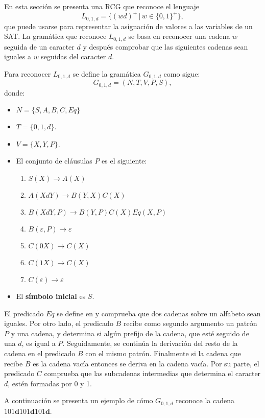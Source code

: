En esta sección se presenta una RCG que reconoce el lenguaje $$L_{0,1,d}=\{(wd)^+\,|\,w\in\{0,1\}^+\},$$ que puede usarse para representar la asignación de valores a las variables de un SAT. La gramática que reconoce $L_{0,1,d}$ se basa en reconocer una cadena $w$ seguida de un caracter $d$ y después comprobar que las siguientes cadenas sean iguales a $w$ seguidas del caracter $d$.

Para reconocer $L_{0,1,d}$ se define la gramática $G_{0,1,d}$ como sigue:
\[
    G_{0,1,d} = (N, T, V, P, S),
\]
donde:

\begin{itemize}
    \item $N=\{S,A,B,C,Eq\}$
    \item $T=\{0,1,d\}$.
    \item $V=\{X,Y,P\}$.
    \item El conjunto de cláusulas $P$ es el siguiente:
          \begin{enumerate}
              \item $S(X)\to A(X)$
              \item $A(XdY)\to B(Y,X)C(X)$
              \item $B(XdY,P)\to B(Y,P) C(X) Eq(X,P)$
              \item $B(\varepsilon,P)\to \varepsilon$
              \item $C(0X)\to C(X)$
              \item $C(1X)\to C(X)$
              \item $C(\varepsilon)\to \varepsilon$
          \end{enumerate}
    \item El \textbf{símbolo inicial} es $S$.
\end{itemize}

El predicado $Eq$ se define en \cite{mainRCGBib} y comprueba que dos cadenas sobre un alfabeto sean iguales. 
Por otro lado, el predicado $B$ recibe como segundo argumento un patrón $P$  y una cadena, y determina si 
algún prefijo de la cadena, que esté seguido de una $d$, es igual a $P$. Seguidamente, se continúa la 
derivación del resto de la cadena en el predicado $B$ con el mismo patrón. Finalmente si la cadena que 
recibe $B$ es la cadena vacía entonces se deriva en la cadena vacía. Por su parte, el predicado $C$
comprueba que las subcadenas intermedias que determina el caracter $d$, estén formadas por 0 y 1.

A continuación se presenta un ejemplo de cómo $G_{0,1,d}$ reconoce la cadena $101\mathbf{d}101\mathbf{d}101\mathbf{d}$.

